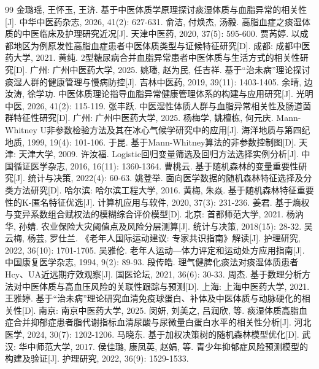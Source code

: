 \documentclass[a4paper,12pt]{ctexart}
\begin{document}
\begin{thebibliography}{99}
金璐瑶, 王怀玉, 王济. 基于中医体质学原理探讨痰湿体质与血脂异常的相关性[J]. 中华中医药杂志, 2026, 41(2): 627-631.
俞洁, 付焕杰, 汤毅. 高脂血症之痰湿体质的中医临床及护理研究近况[J]. 天津中医药, 2020, 37(5): 595-600.
贾芮婷. 以成都地区为例原发性高脂血症患者中医体质类型与证候特征研究[D]. 成都: 成都中医药大学, 2021.
黄纯. 2型糖尿病合并血脂异常患者中医体质与生活方式的相关性研究[D]. 广州: 广州中医药大学, 2025.
姚璠, 赵为民, 任吉祥. 基于``治未病''理论探讨痰湿人群的健康管理与慢病防控[J]. 吉林中医药, 2019, 39(11): 1403-1405.
余晴, 边汝涛, 徐学功. 中医体质理论指导血脂异常健康管理体系的构建与应用研究[J]. 光明中医, 2026, 41(2): 115-119.
张丰跃. 中医湿性体质人群与血脂异常相关性及肠道菌群特征性研究[D]. 广州: 广州中医药大学, 2025.
杨梅学, 姚檀栋, 何元庆. Mann-Whitney U非参数检验方法及其在冰心气候学研究中的应用[J]. 海洋地质与第四纪地质, 1999, 19(4): 101-106.
于昆. 基于Mann-Whitney算法的非参数控制图[D]. 天津: 天津大学, 2009.
许汝福. Logistic回归变量筛选及回归方法选择实例分析[J]. 中国循证医学杂志, 2016, 16(11): 1360-1364.
曹桃云. 基于随机森林的变量重要性研究[J]. 统计与决策, 2022(4): 60-63.
姚登举. 面向医学数据的随机森林特征选择及分类方法研究[D]. 哈尔滨: 哈尔滨工程大学, 2016.
黄梅, 朱焱. 基于随机森林特征重要性的K-匿名特征优选[J]. 计算机应用与软件, 2020, 37(3): 231-236.
姜君. 基于熵权与变异系数组合赋权法的模糊综合评价模型[D]. 北京: 首都师范大学, 2021.
杨汭华, 孙婧. 农业保险大灾阈值点及风险分层测算[J]. 统计与决策, 2018(15): 28-32.
吴云梅, 杨芸, 罗仕兰. 《老年人国际运动建议: 专家共识指南》解读[J]. 护理研究, 2022, 36(10): 1701-1705.
吴雅伦. 老年人运动---体力评定和运动处方应用指南[J]. 中国康复医学杂志, 1994, 9(2): 89-93.
段传皓. 理气健脾化痰法对痰湿体质患者Hcy、UA近远期疗效观察[J]. 国医论坛, 2021, 36(6): 30-33.
周杰. 基于数理分析方法对中医体质与高血压风险的关联性跟踪与预测[D]. 上海: 上海中医药大学, 2021.
王雅婷. 基于``治未病''理论研究血清免疫球蛋白、补体及中医体质与动脉硬化的相关性[D]. 南京: 南京中医药大学, 2025.
闵妍, 刘美之, 吕润欣, 等. 痰湿体质高脂血症合并抑郁症患者脂代谢指标血清尿酸与尿微量白蛋白水平的相关性分析[J]. 河北医学, 2024, 30(7): 1202-1206.
马晓东. 基于加权决策树的随机森林模型优化[D]. 武汉: 华中师范大学, 2017.
侯佳璐, 康凤英, 赵娟, 等. 青少年抑郁症风险预测模型的构建及验证[J]. 护理研究, 2022, 36(9): 1529-1533.
\end{thebibliography}
\end{document}
